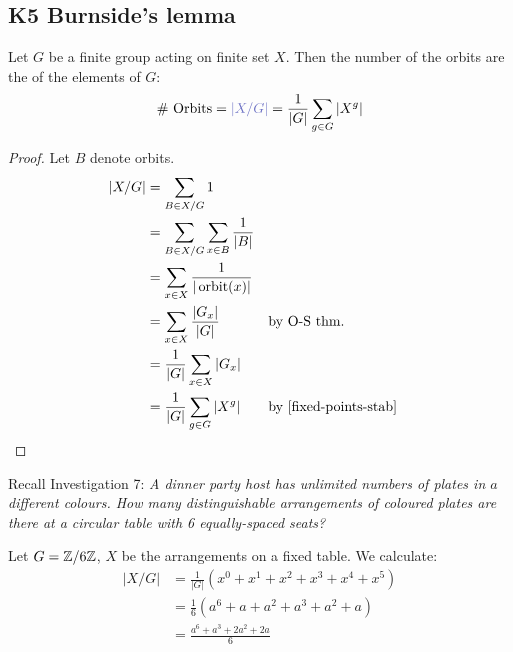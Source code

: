 \documentclass[12pt]{article}
\begin{document}
\subsection{K5 Burnside's lemma}
\begin{lemma}[Burnside's]
    Let $G$ be a finite group acting on finite set $X$. Then the number of the orbits are the  of the elements of $G$: \[\# \text{ Orbits}  = \pt{|X/G|}= \frac{1}{|G|}\sum_{g\in G}|X^{g}|\]
\end{lemma}
\begin{proof}
    Let $B$ denote orbits.
    \begin{align*}
        |X/G| &= \sum_{B\in X/G}1\\
        &= \sum_{B\in X/G}\sum_{x\in B}\frac{1}{|B|}\\
        &= \sum_{x\in X}\frac{1}{|\operatorname*{orbit}(x)|}\\
        &= \sum_{x\in X}\frac{|G_x|}{|G|} && \text{by O-S thm.}\\
        &= \frac{1}{|G|}\sum_{x\in X}|G_x|\\
        &= \frac{1}{|G|}\sum_{g\in G}|X^{g}| && \text{by \cref{fixed-points-stab}}
    \end{align*}
\end{proof}

\eg Recall Investigation 7: \textit{A dinner party host has unlimited numbers of plates in $a$ different colours.
How many distinguishable arrangements of coloured plates are there at a circular table with
6 equally-spaced seats? }

Let $G=\mathbb{Z\text{/6}Z}$, $X$ be the arrangements on a fixed table. We calculate: \begin{align*}
    |X/G| &= \frac{1}{|G|}\left(x^0+x^1+x^2+x^3+x^4+x^5\right)\\
    &= \frac{1}{6}(a^6+a+a^2+a^3+a^2+a)\\
    &= \frac{a^6+a^3+2a^2+2a}{6}
\end{align*}
\end{document}
